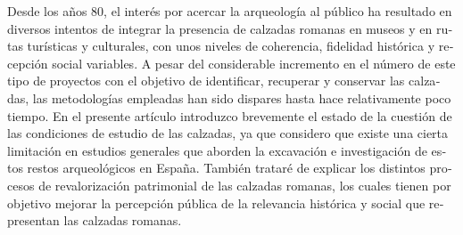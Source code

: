 \begin{myabstract}\foreignlanguage{spanish}{%
	 	Desde los años 80, el interés por acercar la arqueología al público ha resultado en diversos intentos de integrar la presencia de calzadas romanas en museos y en rutas turísticas y culturales, con unos niveles de coherencia, fidelidad histórica y recepción social variables. A pesar del considerable incremento en el número de este tipo de proyectos con el objetivo de identificar, recuperar y conservar las calzadas, las metodologías empleadas han sido dispares hasta hace relativamente poco tiempo. En el presente artículo introduzco brevemente el estado de la cuestión de las condiciones de estudio de las calzadas, ya que considero que existe una cierta limitación en estudios generales que aborden la excavación e investigación de estos restos arqueológicos en España. También trataré de explicar los distintos procesos de revalorización patrimonial de las calzadas romanas, los cuales tienen por objetivo mejorar la percepción pública de la relevancia histórica y social que representan las calzadas romanas.}
	 	

\end{myabstract}

\printbibliography[heading=subbibnumbered] 
\label{verdu:lastpage}
\closingarticle